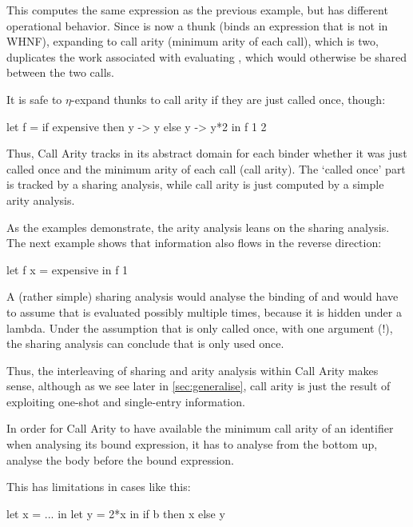This computes the same expression as the previous example, but has different operational behavior.
Since  is now a thunk (\eg binds an expression that is not in WHNF), expanding  to call arity (minimum arity of each call), which is two, duplicates the work associated with evaluating , which would otherwise be shared between the two calls.

It is safe to $\eta$-expand thunks to call arity if they are just called once, though:
\begin{haskellcode}
  let f =
        if expensive
        then \x y -> y
        else \x y -> y*2
  in f 1 2
\end{haskellcode}

Thus, Call Arity tracks in its abstract domain for each binder whether it was just called once and the minimum arity of each call (call arity).
The `called once' part is tracked by a sharing analysis, while call arity is just computed by a simple arity analysis.

As the examples demonstrate, the arity analysis leans on the sharing analysis.
The next example shows that information also flows in the reverse direction:
\begin{haskellcode}
  let f x = expensive
  in f 1
\end{haskellcode}

A (rather simple) sharing analysis would analyse the binding of  and would have to assume that  is evaluated possibly multiple times, because it is hidden under a lambda.
Under the assumption that  is only called once, with one argument (!), the sharing analysis can conclude that  is only used once.

Thus, the interleaving of sharing and arity analysis within Call Arity makes sense, although as we see later in \cref{sec:generalise}, call arity is just the result of exploiting one-shot and single-entry information.\smallskip

In order for Call Arity to have available the minimum call arity of an identifier when analysing its bound expression, it has to analyse  from the bottom up, \eg analyse the body before the bound expression.

This has limitations in cases like this:
\begin{haskellcode}
  let x = ...
  in let y = 2*x
     in if b
        then x
        else y
\end{haskellcode}


